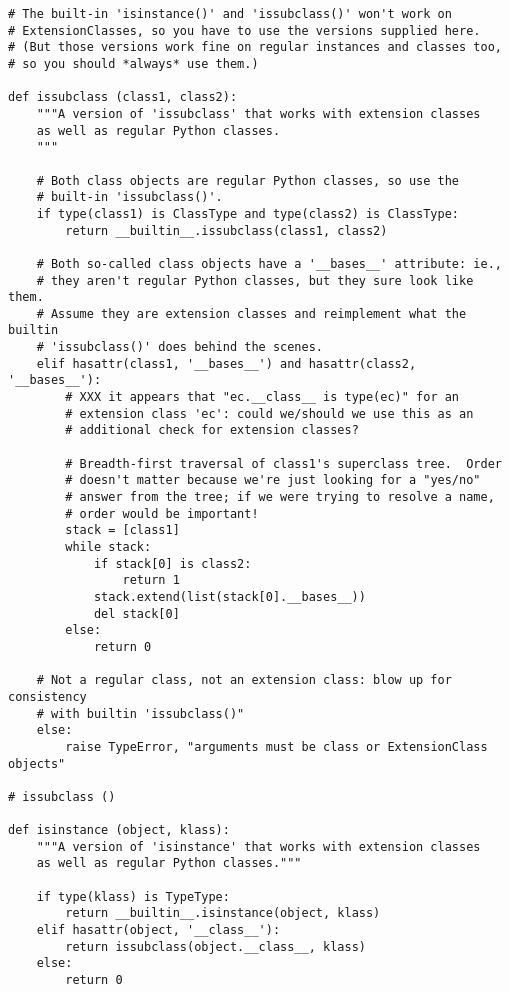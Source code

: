 \begin{verbatim}
# The built-in 'isinstance()' and 'issubclass()' won't work on
# ExtensionClasses, so you have to use the versions supplied here.
# (But those versions work fine on regular instances and classes too,
# so you should *always* use them.)

def issubclass (class1, class2):
    """A version of 'issubclass' that works with extension classes
    as well as regular Python classes.
    """

    # Both class objects are regular Python classes, so use the
    # built-in 'issubclass()'.
    if type(class1) is ClassType and type(class2) is ClassType:
        return __builtin__.issubclass(class1, class2)

    # Both so-called class objects have a '__bases__' attribute: ie.,
    # they aren't regular Python classes, but they sure look like them.
    # Assume they are extension classes and reimplement what the builtin
    # 'issubclass()' does behind the scenes.
    elif hasattr(class1, '__bases__') and hasattr(class2, '__bases__'):
        # XXX it appears that "ec.__class__ is type(ec)" for an
        # extension class 'ec': could we/should we use this as an
        # additional check for extension classes?

        # Breadth-first traversal of class1's superclass tree.  Order
        # doesn't matter because we're just looking for a "yes/no"
        # answer from the tree; if we were trying to resolve a name,
        # order would be important!
        stack = [class1]
        while stack:
            if stack[0] is class2:
                return 1
            stack.extend(list(stack[0].__bases__))
            del stack[0]
        else:
            return 0

    # Not a regular class, not an extension class: blow up for consistency
    # with builtin 'issubclass()"
    else:
        raise TypeError, "arguments must be class or ExtensionClass objects"

# issubclass ()

def isinstance (object, klass):
    """A version of 'isinstance' that works with extension classes
    as well as regular Python classes."""

    if type(klass) is TypeType:
        return __builtin__.isinstance(object, klass)
    elif hasattr(object, '__class__'):
        return issubclass(object.__class__, klass)
    else:
        return 0
\end{verbatim}

